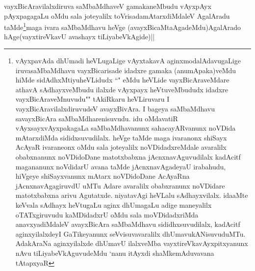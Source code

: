 \begin{artha}
vayxBicAravilalxdiruva saMbaMdhaveV gamakaneMbudu vAyxpAyx pAyxpagagaLu oMdu sala joteyalilx toVrisadamAtarxdiMdaleV AgalAradu taMde\footnote{vAyxpavAda dhUmadi heVLugaLige vAyxtakavA aginxmodalAdavugaLige iruvasaMbaMdhavu vayxBicarisade idadxre gamaka (anumApaka)veMdu hiMde sidAdhxMtiyuheVLidudx ``\stext" eMdu heVLide vayxBicAraveMdare athavA sAdhayxveMbudu ilalxde vAyxpayx heVtuveMbududx idadxre vayxBicAraveMnuvudu"\stext" tAkiRkaru heVLiruvaru I vayxBicAravilalxdiruvudeV avayxBivAra. I bageya saMbaMdhavu savayxBicAra saMbaMdharenisuvudu. idu oMdavatiR vAyxsayxvAyxpakagaLa saMbaMdhavanunx sahacayARvanunx noVDida mAtarxdiMda sididxsuvudilalx. heVge taMde maga ivaranonx shiSayx AcAyaR ivaraneonx oMdu sala joteyalilx noVDidadxreMdale avaralilx obabxnanunx noVDidoDane matotxbabxna jAcnxnavAguvudilalx kadAcitf magananunx noVdidarU avana taMde jAcnxnavAgadeyaU irabahudu, hiVgeye shiSayxvanunx mAtarx noVDidoDane AcAyaRna jAcnxnavAgagiruvdU uMTu  Adare avaralilx obabxranunx noVDidare matotxbabxna arivu Agutatxde. niyatavAgi heVLalu sAdhayxvilalx. idaaMte keVvala sAdhayx heVtugaLu aginx dhUmagaLu adige maneyalilx oTATxgiruvudu kaMDidadxrU oMdu sala moVDidadxriMda anavxyadiMdaleV avayxBicAra saMbaMdhavu sididhxsuvudilalx, kadAcitf aginxyilalxdeyI GaTikeyanunx seVvisuvavaralilx dhUmavukANisuvuduMTu. AdakAraNa aginxyilalxde dhUmavU ilalxveMba vayxtireVkavAyxpitxyanunx nAvu tiLiyabeVkAguvudeMdu `nanu itAyxdi shaMkemAduvavana tAtapxyaR}maga ivara saMbaMdhavu heVge (avayxBicaMtaAgadeMdu)AgalArado hAge(vayxtireVkavU avashayx tiLiyabeVkAgide)||
\end{artha}

